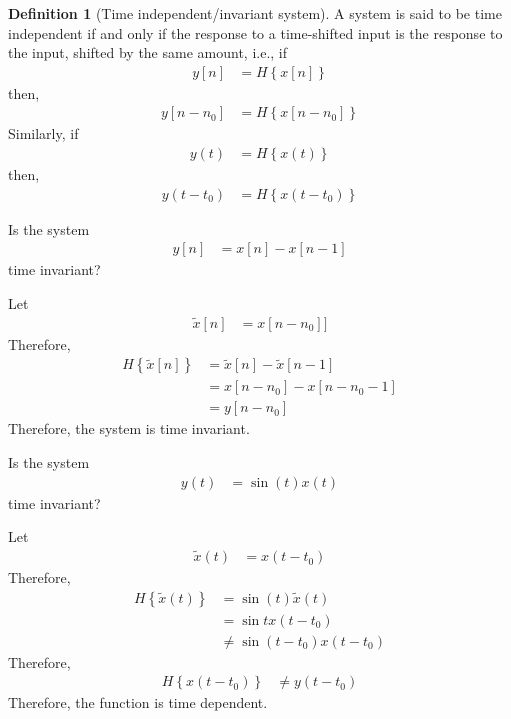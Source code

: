 \documentclass[titlepage, fleqn, a4paper, 12pt, twoside]{article}
\theoremstyle{definition}
\newtheorem{definition}{Definition}
\theoremstyle{theorem}
\renewcommand{\tilde}{\widetilde}
\begin{document}
\begin{definition}[Time independent/invariant system]
	A system is said to be time independent if and only if the response to a time-shifted input is the response to the input, shifted by the same amount, i.e., if
	\begin{align*}
		y[n] & = H\left\{ x[n] \right\}
	\end{align*}
	then,
	\begin{align*}
		y[n - n_0] & = H\left\{ x[n - n_0] \right\}
	\end{align*}
	Similarly, if
	\begin{align*}
		y(t) & = H\left\{ x(t) \right\}
	\end{align*}
	then,
	\begin{align*}
		y(t - t_0) & = H\left\{ x(t - t_0) \right\}
	\end{align*}
\end{definition}

\begin{question}
	Is the system
	\begin{align*}
		y[n] & = x[n] - x[n - 1]
	\end{align*}
	time invariant?
\end{question}

\begin{solution}
	Let
	\begin{align*}
		\tilde{x}[n] & = x[n - n_0]]
	\end{align*}
	Therefore,
	\begin{align*}
		H\left\{ \tilde{x}[n] \right\} & = \tilde{x}[n] - \tilde{x}[n - 1] \\
                                               & = x[n - n_0] - x[n - n_0 - 1]     \\
                                               & = y[n - n_0]
	\end{align*}
	Therefore, the system is time invariant.
\end{solution}

\begin{question}
	Is the system
	\begin{align*}
		y(t) & = \sin(t) x(t)
	\end{align*}
	time invariant?
\end{question}

\begin{solution}
	Let
	\begin{align*}
		\tilde{x}(t) & = x(t - t_0)
	\end{align*}
	Therefore,
	\begin{align*}
		H\left\{ \tilde{x}(t) \right\} & = \sin(t) \tilde{x}(t) \\
                                               & = \sin t x(t - t_0)    \\
                                               & \neq \sin(t - t_0) x(t - t_0)
	\end{align*}
	Therefore,
	\begin{align*}
		H\left\{ x(t - t_0) \right\} & \neq y(t - t_0)
	\end{align*}
	Therefore, the function is time dependent.
\end{solution}
\end{document}
